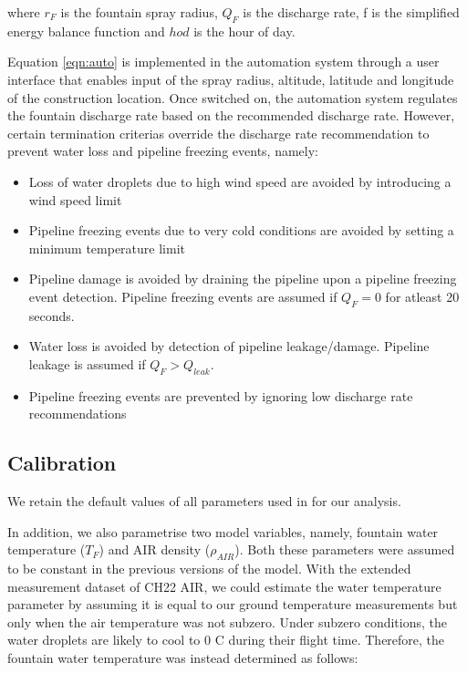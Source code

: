 \documentclass[tc, manuscript]{copernicus}
\begin{document}
where $r_F$ is the fountain spray radius, $Q_{F}$ is the discharge rate, f is the simplified energy balance
function and $hod$ is the hour of day.

Equation \ref{eqn:auto} is implemented in the automation system through a user interface that enables input of
the spray radius, altitude, latitude and longitude of the construction location. Once switched on, the
automation system regulates the fountain discharge rate based on the recommended discharge rate. However,
certain termination criterias override the discharge rate recommendation to prevent water loss and pipeline
freezing events, namely: 

\begin{itemize}

\item Loss of water droplets due to high wind speed are avoided by introducing a wind speed limit 

\item Pipeline freezing events due to very cold conditions are avoided by setting a minimum temperature limit 

\item Pipeline damage is avoided by draining the pipeline upon a pipeline freezing event detection. Pipeline
  freezing events are assumed if $Q_F = 0$ for atleast 20 seconds.

\item Water loss is avoided by detection of pipeline leakage/damage. Pipeline leakage is assumed if $Q_F > Q_{leak}$. 

\item Pipeline freezing events are prevented by ignoring low discharge rate recommendations  

\end{itemize}

\subsection{Calibration}
We retain the default values of all parameters used in
\cite{balasubramanianInfluenceMeteorologicalConditions2022} for our analysis.  

In addition, we also parametrise two model variables, namely, fountain water temperature ($T_F$) and AIR density
($\rho_{AIR}$). Both these parameters were assumed to be constant in the previous versions of the model. With
the extended measurement dataset of CH22 AIR, we could estimate the water temperature parameter by assuming it
is equal to our ground temperature measurements but only when the air temperature was not subzero. Under subzero
conditions, the water droplets are likely to cool to 0 C during their flight time. Therefore, the fountain water
temperature was instead determined as follows:
\end{document}
